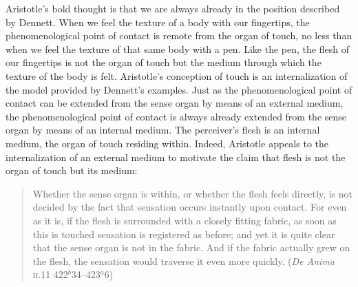 Aristotle's bold thought is that we are always already in the position described by Dennett. When we feel the texture of a body with our fingertips, the phenomenological point of contact is remote from the organ of touch, no less than when we feel the texture of that same body with a pen. Like the pen, the flesh of our fingertips is not the organ of touch but the medium through which the texture of the body is felt. Aristotle's conception of touch is an internalization of the model provided by Dennett's examples. Just as the phenomenological point of contact can be extended from the sense organ by means of an external medium, the phenomenological point of contact is always already extended from the sense organ by means of an internal medium. The perceiver's flesh is an internal medium, the organ of touch residing within. Indeed, Aristotle appeals to the internalization of an external medium to motivate the claim that flesh is not the organ of touch but its medium:
\begin{quote}
    Whether the sense organ is within, or whether the flesh feels directly, is not decided by the fact that sensation occurs instantly upon contact. For even as it is, if the flesh is surrounded with a closely fitting fabric, as soon as this is touched sensation is registered as before; and yet it is quite clear that the sense organ is not in the fabric. And if the fabric actually grew on the flesh, the sensation would traverse it even more quickly. (\emph{De Anima} \textsc{ii}.11 422\( ^{b} \)34--423\( ^{a} \)6)
\end{quote}


